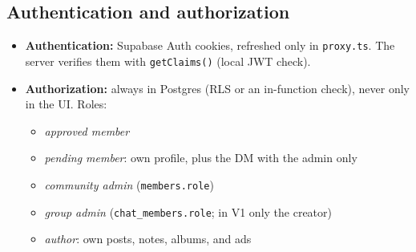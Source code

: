 \documentclass[11pt,a4paper]{article}
\newcommand{\code}[1]{\texttt{\small #1}}
\begin{document}
\subsection{Authentication and authorization}
\begin{itemize}
  \item \textbf{Authentication:} Supabase Auth cookies, refreshed only in \code{proxy.ts}. The server verifies them
        with \code{getClaims()} (local JWT check).
  \item \textbf{Authorization:} always in Postgres (RLS or an in-function check), never only in the UI. Roles:
        \begin{itemize}
          \item \emph{approved member}
          \item \emph{pending member}: own profile, plus the DM with the admin only
          \item \emph{community admin} (\code{members.role})
          \item \emph{group admin} (\code{chat\_members.role}; in V1 only the creator)
          \item \emph{author}: own posts, notes, albums, and ads
        \end{itemize}
\end{itemize}
\end{document}
